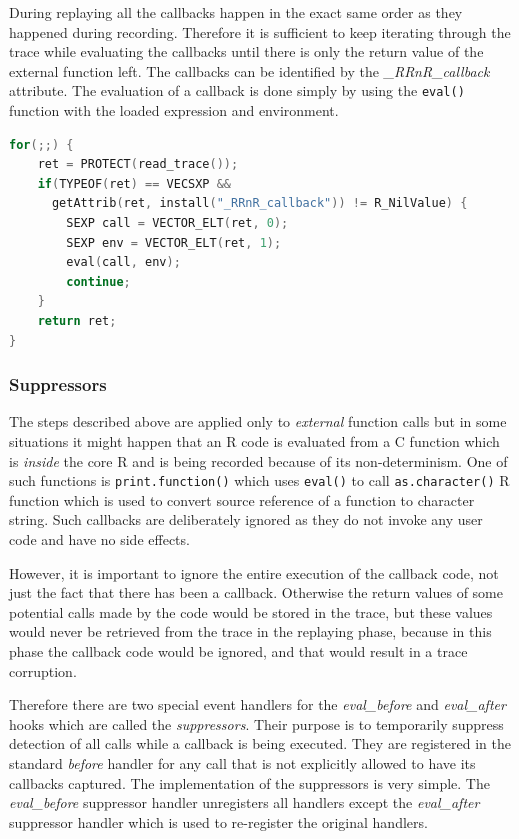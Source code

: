 \documentclass[thesis=M,english,hidelinks]{FITthesis}[2012/10/20]
\begin{document}
			During replaying all the callbacks happen in the exact same order as they happened during recording. Therefore it is sufficient to keep iterating through the trace while evaluating the callbacks until there is only the return value of the external function left. The callbacks can be identified by the \emph{\_RRnR\_callback} attribute. The evaluation of a callback is done simply by using the \lstinline|eval()| function with the loaded expression and environment.\par
			
\begin{lstlisting}[style=filestyle, language=C, caption={Iterating over the trace in the \emph{after} handler during replay}]
for(;;) {
	ret = PROTECT(read_trace());
	if(TYPEOF(ret) == VECSXP &&
	  getAttrib(ret, install("_RRnR_callback")) != R_NilValue) {
		SEXP call = VECTOR_ELT(ret, 0);
		SEXP env = VECTOR_ELT(ret, 1);
		eval(call, env);
		continue;
	}
	return ret;
}
\end{lstlisting}
			
			\subsubsection{Suppressors}
			The steps described above are applied only to \emph{external} function calls but in some situations it might happen that an R code is evaluated from a C function which is \emph{inside} the core R and is being recorded because of its non-determinism. One of such functions is \lstinline|print.function()| which uses \lstinline|eval()| to call \lstinline|as.character()| R function which is used to convert source reference of a function to character string. Such callbacks are deliberately ignored as they do not invoke any user code and have no side effects.\par
			
			However, it is important to ignore the entire execution of the callback code, not just the fact that there has been a callback. Otherwise the return values of some potential calls made by the code would be stored in the trace, but these values would never be retrieved from the trace in the replaying phase, because in this phase the callback code would be ignored, and that would result in a trace corruption.\par
			
			Therefore there are two special event handlers for the \emph{eval\_before} and \emph{eval\_after} hooks which are called the \emph{suppressors}. Their purpose is to temporarily suppress detection of all calls while a callback is being executed. They are registered in the standard \emph{before} handler for any call that is not explicitly allowed to have its callbacks captured. The implementation of the suppressors is very simple. The \emph{eval\_before} suppressor handler unregisters all handlers except the \emph{eval\_after} suppressor handler which is used to re-register the original handlers.\par
			
\end{document}
